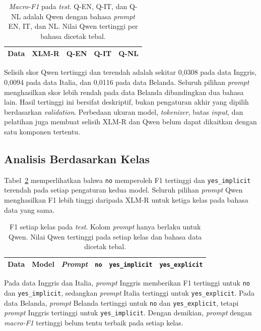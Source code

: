 \documentclass[11pt]{article}
\begin{document}
\begin{table}[t]
\centering\small
\setlength{\tabcolsep}{2pt}
\begin{tabular}{lrrrr}
\toprule
Data & XLM-R & Q-EN & Q-IT & Q-NL \\
\midrule

\end{tabular}
\caption{\textit{Macro-F1} pada \textit{test}. Q-EN, Q-IT, dan Q-NL adalah Qwen dengan bahasa \textit{prompt} EN, IT, dan NL. Nilai Qwen tertinggi per bahasa dicetak tebal.}
\label{tab:main}
\end{table}

Selisih skor Qwen tertinggi dan terendah adalah sekitar 0,0308 pada data Inggris, 0,0094 pada data Italia, dan 0,0116 pada data Belanda. Seluruh pilihan \textit{prompt} menghasilkan skor lebih rendah pada data Belanda dibandingkan dua bahasa lain. Hasil tertinggi ini bersifat deskriptif, bukan pengaturan akhir yang dipilih berdasarkan \textit{validation}. Perbedaan ukuran model, \textit{tokenizer}, batas \textit{input}, dan pelatihan juga membuat selisih XLM-R dan Qwen belum dapat dikaitkan dengan satu komponen tertentu.

\subsection{Analisis Berdasarkan Kelas}
Tabel~\ref{tab:classes} memperlihatkan bahwa \texttt{no} memperoleh F1 tertinggi dan \texttt{yes\_implicit} terendah pada setiap pengaturan kedua model. Seluruh pilihan \textit{prompt} Qwen menghasilkan F1 lebih tinggi daripada XLM-R untuk ketiga kelas pada bahasa data yang sama.

\begin{table}[t]
\centering\small
\begin{tabular}{lllrrr}
\toprule
Data & Model & \textit{Prompt} & \texttt{no} & \texttt{yes\_implicit} & \texttt{yes\_explicit} \\
\midrule

\end{tabular}
\caption{F1 setiap kelas pada \textit{test}. Kolom \textit{prompt} hanya berlaku untuk Qwen. Nilai Qwen tertinggi pada setiap kelas dan bahasa data dicetak tebal.}
\label{tab:classes}
\end{table}

Pada data Inggris dan Italia, \textit{prompt} Inggris memberikan F1 tertinggi untuk \texttt{no} dan \nolinkurl{yes_implicit}, sedangkan \textit{prompt} Italia tertinggi untuk \nolinkurl{yes_explicit}. Pada data Belanda, \textit{prompt} Belanda tertinggi untuk \texttt{no} dan \nolinkurl{yes_explicit}, tetapi \textit{prompt} Inggris tertinggi untuk \nolinkurl{yes_implicit}. Dengan demikian, \textit{prompt} dengan \textit{macro-F1} tertinggi belum tentu terbaik pada setiap kelas.
\end{document}
